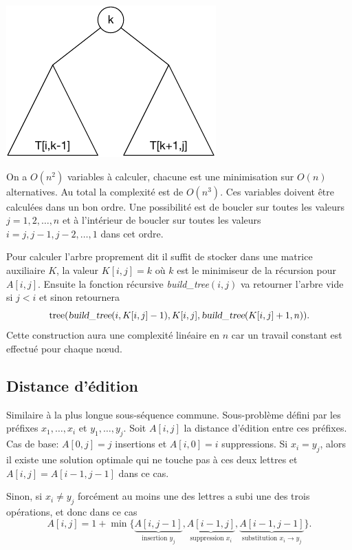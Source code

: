 \documentclass[12pt]{article}
\begin{document}
     \centerline{\includegraphics{abre_bin_rech_opt.pdf}}


On a $O(n^2)$ variables à calculer, chacune est une minimisation sur $O(n)$ alternatives. Au total la complexité est de $O(n^3)$.
Ces variables doivent être calculées dans un bon ordre. Une possibilité est de boucler sur toutes les valeurs $j=1,2,\ldots, n$ et à l'intérieur de boucler sur toutes les valeurs $i=j,j-1, j-2, \ldots, 1$ dans cet ordre.

Pour calculer l'arbre proprement dit il suffit de stocker dans une matrice auxiliaire $K$, la valeur $K[i,j]=k$ où $k$ est le minimiseur de la récursion pour $A[i,j]$.  Ensuite la fonction récursive \textsl{build\_tree}$(i,j)$ va retourner l'arbre vide si $j<i$ et sinon retournera 
\[
\textrm{tree}(\textsl{build\_tree}(i,K[i,j]-1), K[i,j], \textsl{build\_tree}(K[i,j]+1,n)).
\]
Cette construction aura une complexité linéaire en $n$ car un travail constant est effectué pour chaque nœud.


\subsection{Distance d'édition}

Similaire à la plus longue sous-séquence commune.
Sous-problème défini par les préfixes $x_1,\ldots,x_i$ et $y_1,\ldots,y_j$.
Soit $A[i,j]$ la distance d'édition entre ces préfixes. 
Cas de base: $A[0,j]=j$ insertions et $A[i,0]=i$ suppressions.
Si $x_i=y_j$, alors il existe une solution optimale qui ne touche pas à ces deux lettres et $A[i,j]= A[i-1,j-1]$ dans ce cas.

Sinon, si $x_i\neq y_j$ forcément au moins une des lettres a subi une des trois opérations, et donc dans ce cas
\[
A[i,j] = 1 + \min\{ \underbrace{A[ i,j-1 ]}_{\textrm{insertion $y_j$}}, 
 \underbrace{A[i-1,j]}_{\textrm{suppression $x_i$}}, 
 \underbrace{A[i-1,j-1]}_{\textrm{substitution $x_i \rightarrow y_j$}} \}.
\]
\end{document}

